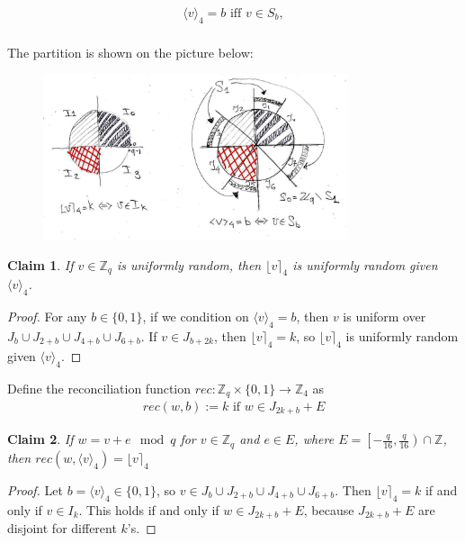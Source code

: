 \documentclass[12pt]{article}
\newcommand{\Z}{\mathbb{Z}}
\newtheorem{claim}{Claim}
\begin{document}
\begin{align*}
\langle v \rangle_4 = b\text{ iff } v \in S_b,\\
\end{align*}

The partition is shown on the picture below:
\begin{figure}[H]
    \centering
    \includegraphics[width=0.8\textwidth]{2bits_pic.jpg}
\end{figure}

\begin{claim}
If $v \in \Z_q$ is uniformly random, then $\lfloor v \rceil_4$ is uniformly random given $\langle v \rangle_4$.
\end{claim}
\begin{proof}
For any $b \in \{0, 1\}$, if we condition on $\langle v \rangle_4 = b$, then $v$ is uniform over $J_b \cup J_{2+b} \cup J_{4+b} \cup J_{6+b}$. If $v \in J_{b + 2k}$, then $\lfloor v \rceil_4 = k$, so $\lfloor v \rceil_4$ is uniformly random given $\langle v \rangle_4$.
\end{proof}

Define the reconciliation function $rec: \Z_q \times \{0, 1\} \rightarrow \Z_4$ as
\begin{align*}
rec(w, b):= k\text{ if } w \in J_{2k + b} + E
\end{align*}

\begin{claim}
If $w = v + e \mod q$ for $v \in \Z_q$ and $e \in E$, where $E = \left[-\frac{q}{16}, \frac{q}{16}\right) \cap \Z$, then $rec(w, \langle v \rangle_4) = \lfloor v \rceil_4$
\end{claim}
\begin{proof}
Let $b = \langle v \rangle_4 \in \{0, 1\}$, so $v \in J_b \cup J_{2+b} \cup J_{4+b} \cup J_{6+b}$. Then $\lfloor v \rceil_4 = k$ if and only if $v \in I_k$. This holds if and only if $w \in J_{2k + b} + E$, because $J_{2k + b} + E$ are disjoint for different $k$'s.
\end{proof}
\end{document}
